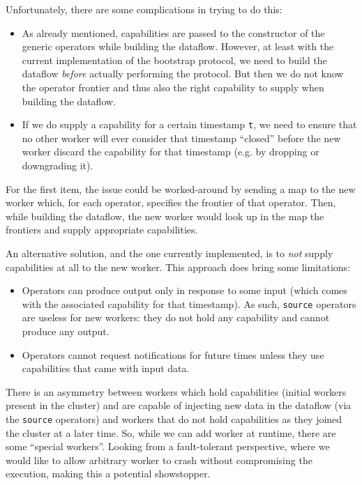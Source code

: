 \documentclass[12pt]{extarticle}
\begin{document}
Unfortunately, there are some complications in trying to do this:
\begin{itemize}
    \item As already mentioned, capabilities are passed to the constructor
        of the generic operators while building the dataflow. However, at least
        with the current implementation of the bootstrap protocol, we need to build
        the dataflow \textit{before} actually performing the protocol. But then
        we do not know the operator frontier and thus also the right capability to supply when building the dataflow.

    \item If we do supply a capability for a certain timestamp \verb|t|, we need to ensure
        that no other worker will ever consider that timestamp ``closed'' before the new
        worker discard the capability for that timestamp (e.g. by dropping or downgrading it).

\end{itemize}

For the first item, the issue could be worked-around by sending a map to the new
worker which, for each operator, specifies the frontier of that operator.
Then, while building the dataflow, the new worker would look up in the map the frontiers
and supply appropriate capabilities.

An alternative solution, and the one currently implemented, is to \textit{not} supply capabilities at all to the new worker.
This approach does bring some limitations:
\begin{itemize}
    \item Operators can produce output only in response to some input (which comes with the associated capability for that timestamp).
        As such, \verb|source| operators are useless for new workers: they do not hold any capability and cannot produce any output.
    \item Operators cannot request notifications for future times unless they use capabilities that came with input data.
\end{itemize}

There is an asymmetry between workers which hold capabilities (initial workers present in the cluster)
and are capable of injecting new data in the dataflow (via the \verb|source| operators) and workers
that do not hold capabilities as they joined the cluster at a later time. So, while we can add worker
at runtime, there are some ``special workers''.
Looking from a fault-tolerant perspective, where we would like to allow arbitrary worker to crash without
compromising the execution, making this a potential showstopper.
\end{document}
